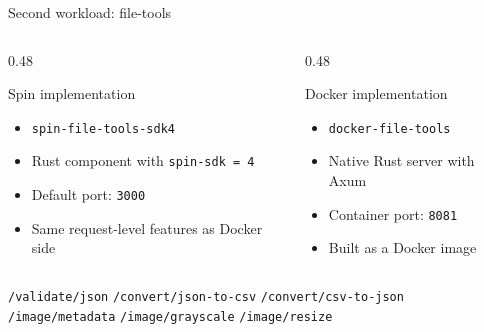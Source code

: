 \documentclass[aspectratio=169,10pt]{beamer}
\begin{document}
\begin{frame}{Second workload: file-tools}
  \begin{columns}[T,onlytextwidth]
    \begin{column}{0.48\linewidth}
      \begin{exampleblock}{Spin implementation}
        \begin{itemize}
          \item \texttt{spin-file-tools-sdk4}
          \item Rust component with \texttt{spin-sdk = 4}
          \item Default port: \texttt{3000}
          \item Same request-level features as Docker side
        \end{itemize}
      \end{exampleblock}
    \end{column}
    \begin{column}{0.48\linewidth}
      \begin{alertblock}{Docker implementation}
        \begin{itemize}
          \item \texttt{docker-file-tools}
          \item Native Rust server with Axum
          \item Container port: \texttt{8081}
          \item Built as a Docker image
        \end{itemize}
      \end{alertblock}
    \end{column}
  \end{columns}

  \vspace{3mm}
  \begin{center}
    \small
    \texttt{/validate/json} \quad
    \texttt{/convert/json-to-csv} \quad
    \texttt{/convert/csv-to-json} \quad
    \texttt{/image/metadata} \quad
    \texttt{/image/grayscale} \quad
    \texttt{/image/resize}
  \end{center}
\end{frame}
\end{document}

